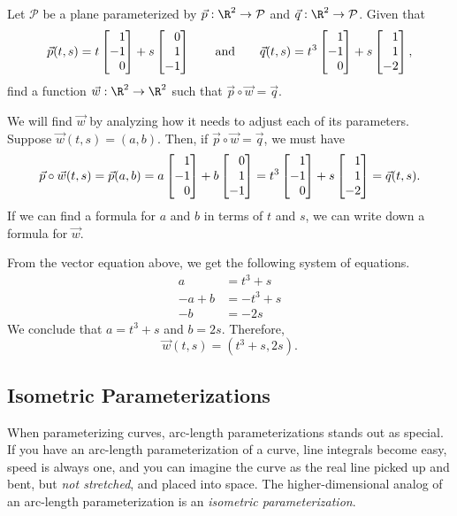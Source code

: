 \begin{example}
	Let $\mathcal P$ be a plane parameterized by $\vec p:\R^2\to\mathcal P$ and $\vec q:\R^2\to\mathcal P$.
	Given that
	\[
		\vec p(t,s) =  t\mat{1\\-1\\0} + s\mat{0\\1\\-1}\qquad\text{and}\qquad
		\vec q(t,s) =  t^3\mat{1\\-1\\0} + s\mat{1\\1\\-2},
	\]
	find a function $\vec w:\R^2\to\R^2$ such that $\vec p\circ \vec w=\vec q$.

	 We will find $\vec w$ by analyzing how it needs to adjust each of its parameters.
	Suppose $\vec w(t,s)=(a,b)$.  Then, if $\vec p\circ\vec w = \vec q$, we must have
	\[
		\vec p\circ \vec w(t,s) = \vec p(a,b) = a\mat{1\\-1\\0}+b\mat{0\\1\\-1}
		=t^3\mat{1\\-1\\0}+s\mat{1\\1\\-2}=\vec q(t,s).
	\]
	If we can find a formula for $a$ and $b$ in terms of $t$ and $s$, we can write down
	a formula for $\vec w$.

	From the vector equation above, we get the following system of equations.
	\begin{align*}
		a &= t^3+s\\
		-a+b&=-t^3+s\\
		-b&=-2s
	\end{align*}
	We conclude that $a=t^3+s$ and $b=2s$.  Therefore,
	\[
		\vec w(t,s) = (t^3+s, 2s).
	\]
\end{example}

\subsection{Isometric Parameterizations}

When parameterizing curves, arc-length parameterizations stands out as special.  If
you have an arc-length parameterization of a curve, line integrals become easy, speed is always one,
and you can imagine the curve as the real line picked up and bent, but \emph{not stretched}, and
placed into space.  The higher-dimensional analog of
an arc-length parameterization is an \emph{isometric parameterization}.

